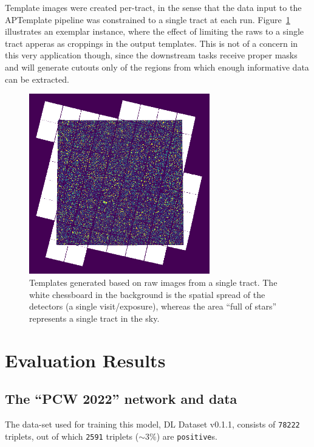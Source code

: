 \documentclass[DM,authoryear,toc]{lsstdoc}
\begin{document}
\clearpage
Template images were created per-tract, in the sense that the data input to the APTemplate pipeline was constrained to a single tract at each run. Figure~\ref{fig:tract_templates} illustrates an exemplar instance, where the effect of limiting the raws to a single tract apperas as croppings in the output templates. This is not of a concern in this very application though, since the downstream tasks receive proper masks and will generate cutouts only of the regions from which enough informative data can be extracted.

\begin{figure}[h]
  \centering
  \includegraphics[width=0.7\textwidth]{tract_templates.png}
  \caption{Templates generated based on raw images from a single tract. The white chessboard in the background is the spatial spread of the detectors (a single visit/exposure), whereas the area ``full of stars'' represents a single tract in the sky.}
  \label{fig:tract_templates}
\end{figure}

\clearpage
\section{Evaluation Results}

\subsection{The ``PCW 2022'' network and data}
The data-set used for training this model, DL Dataset v0.1.1, consists of \texttt{78222} triplets, out of which \texttt{2591} triplets ($\sim 3\%$) are \texttt{positive}s.
\end{document}
